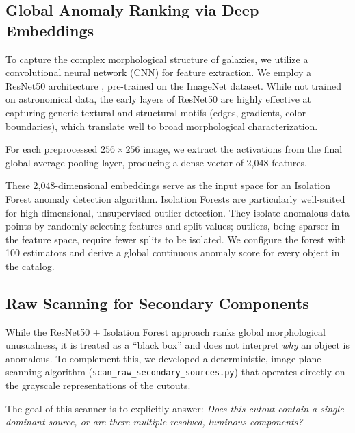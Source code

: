 \documentclass[twocolumn]{aastex631}
\begin{document}
\subsection{Global Anomaly Ranking via Deep Embeddings}
To capture the complex morphological structure of galaxies, we utilize a convolutional neural network (CNN) for feature extraction. We employ a ResNet50 architecture \citep{he2016}, pre-trained on the ImageNet dataset. While not trained on astronomical data, the early layers of ResNet50 are highly effective at capturing generic textural and structural motifs (edges, gradients, color boundaries), which translate well to broad morphological characterization.

For each preprocessed $256 \times 256$ image, we extract the activations from the final global average pooling layer, producing a dense vector of 2,048 features.

These 2,048-dimensional embeddings serve as the input space for an Isolation Forest \citep{liu2008} anomaly detection algorithm. Isolation Forests are particularly well-suited for high-dimensional, unsupervised outlier detection. They isolate anomalous data points by randomly selecting features and split values; outliers, being sparser in the feature space, require fewer splits to be isolated. We configure the forest with 100 estimators and derive a global continuous anomaly score for every object in the catalog.

\subsection{Raw Scanning for Secondary Components}
While the ResNet50 + Isolation Forest approach ranks global morphological unusualness, it is treated as a ``black box'' and does not interpret \textit{why} an object is anomalous. To complement this, we developed a deterministic, image-plane scanning algorithm (\texttt{scan\_raw\_secondary\_sources.py}) that operates directly on the grayscale representations of the cutouts.

The goal of this scanner is to explicitly answer: \textit{Does this cutout contain a single dominant source, or are there multiple resolved, luminous components?}
\end{document}
